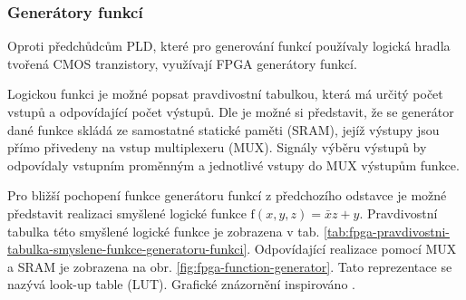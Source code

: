 \documentclass[a4paper, twoside, 11pt]{article}
\begin{document}
		\subsubsection{Generátory funkcí}\label{subsubsec:generatory-funkci}
		Oproti předchůdcům PLD, které pro generování funkcí používaly logická hradla tvořená CMOS tranzistory, využívají FPGA generátory funkcí.\par
		Logickou funkci je možné popsat pravdivostní tabulkou, která má určitý počet vstupů a odpovídající počet výstupů. Dle \cite{Sass2010} je možné si představit, že se generátor dané funkce skládá ze samostatné statické paměti (SRAM), jejíž výstupy jsou přímo přivedeny na vstup multiplexeru (MUX). Signály výběru výstupů by odpovídaly vstupním proměnným a jednotlivé vstupy do MUX výstupům funkce.\par
		Pro bližší pochopení funkce generátoru funkcí z předchozího odstavce je možné představit realizaci smyšlené logické funkce $\text{f} (x, y, z) = \bar{x}z + y$. Pravdivostní tabulka této smyšlené logické funkce je zobrazena v tab. \ref{tab:fpga-pravdivostni-tabulka-smyslene-funkce-generatoru-funkci}. Odpovídající realizace pomocí MUX a SRAM je zobrazena na obr. \ref{fig:fpga-function-generator}. Tato reprezentace se nazývá look-up table (LUT). Grafické znázornění inspirováno \cite{Sass2010}.
		
\end{document}
